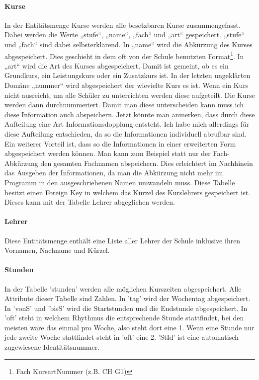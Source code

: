 \documentclass[a4paper, 12pt]{article}
\theoremstyle{plain}
\theoremstyle{definition}
\begin{document}
\paragraph{Kurse} In der Entitätsmenge Kurse werden alle besetzbaren Kurse zusammengefasst. Dabei werden die Werte „stufe“, „name“, „fach“ und „art“ gespeichert. „stufe“ und „fach“ sind dabei selbsterklärend. In „name“ wird die Abkürzung des Kurses abgespeichert. Dies geschieht in dem oft von der Schule benutzten Format\footnote{Fach KursartNummer (z.B. CH G1)}. In „art“ wird die Art des Kurses abgespeichert. Damit ist gemeint, ob es ein Grundkurs, ein Leistungskurs oder ein Zusatzkurs ist. In der letzten ungeklärten Domäne „nummer“ wird abgespeichert der wievielte Kurs es ist. Wenn ein Kurs nicht ausreicht, um alle Schüler zu unterrichten werden diese aufgeteilt. Die Kurse werden dann durchnummeriert. Damit man diese unterscheiden kann muss ich diese Information auch abspeichern. Jetzt könnte man anmerken, dass durch diese Aufteilung eine Art Informationsdopplung entsteht. Ich habe mich allerdings für diese Aufteilung entschieden, da so die Informationen individuell abrufbar sind. Ein weiterer Vorteil ist, dass so die Informationen in einer erweiterten Form abgespeichert werden können. Man kann zum Beispiel statt nur der Fach-Abkürzung den gesamten Fachnamen abspeichern. Dies erleichtert im Nachhinein das Ausgeben der Informationen, da man die Abkürzung nicht mehr im Programm in den ausgeschriebenen Namen umwandeln muss. Diese Tabelle besitzt einen Foreign Key in welchem das Kürzel des Kurslehrers gespeichert ist. Dieses kann mit der Tabelle Lehrer abgeglichen werden.

\paragraph{Lehrer}
\label{sec:Tablehrer}
Diese Entitätsmenge enthält eine Liste aller Lehrer der Schule inklusive ihren Vornamen, Nachname und Kürzel.
\paragraph{Stunden}
In der Tabelle 'stunden' werden alle möglichen Kurszeiten abgespeichert. Alle Attribute dieser Tabelle sind Zahlen. In 'tag' wird der Wochentag abgespeichert. In 'vonS' und 'bisS' wird die Startstunden und die Endstunde abgespeichert. In 'oft' steht in welchem Rhythmus die entsprechende Stunde stattfindet, bei den meisten wäre das einmal pro Woche, also steht dort eine 1. Wenn eine Stunde nur jede zweite Woche stattfindet steht in 'oft' eine 2. 'StId' ist eine automatisch zugewiesene Identitätsnummer.
\end{document}
